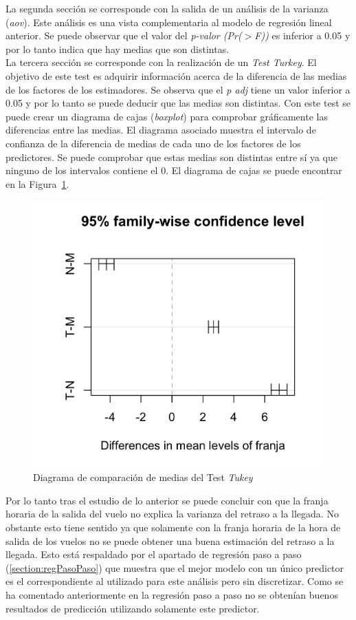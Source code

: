 \documentclass{article}
\begin{document}
La segunda sección se corresponde con la salida de un análisis de la varianza (\textit{aov}). Este análisis es una vista complementaria al modelo de regresión lineal anterior. Se puede observar que el valor del \textit{p-valor (Pr($>$F))} es inferior a 0.05 y por lo tanto indica que hay medias que son distintas.\\

La tercera sección se corresponde con la realización de un \textit{Test Turkey}. El objetivo de este test es adquirir información acerca de la diferencia de las medias de los factores de los estimadores. Se observa que el \textit{p adj} tiene un valor inferior a 0.05 y por lo tanto se puede deducir que las medias son distintas. Con este test se puede crear un diagrama de cajas (\textit{boxplot}) para comprobar gráficamente las diferencias entre las medias. El diagrama asociado muestra el intervalo de confianza de la diferencia de medias de cada uno de los factores de los predictores. Se puede comprobar que estas medias son distintas entre sí ya que ninguno de los intervalos contiene el 0. El diagrama de cajas se puede encontrar en la Figura~\ref{fig:testTukey}.\\

\begin{figure}[h!]
    \centering
    \includegraphics[width=0.7\columnwidth]{images/boxplot.png}
    \caption{Diagrama de comparación de medias del Test \textit{Tukey}}
    \label{fig:testTukey}
\end{figure}

Por lo tanto tras el estudio de lo anterior se puede concluir con que la franja horaria de la salida del vuelo no explica la varianza del retraso a la llegada. No obstante esto tiene sentido ya que solamente con la franja horaria de la hora de salida de los vuelos no se puede obtener una buena estimación del retraso a la llegada. Esto está respaldado por el apartado de regresión paso a paso (\ref{section:regPasoPaso}) que muestra que el mejor modelo con un único predictor es el correspondiente al utilizado para este análisis pero sin discretizar. Como se ha comentado anteriormente en la regresión paso a paso no se obtenían buenos resultados de predicción utilizando solamente este predictor.\\
\end{document}

